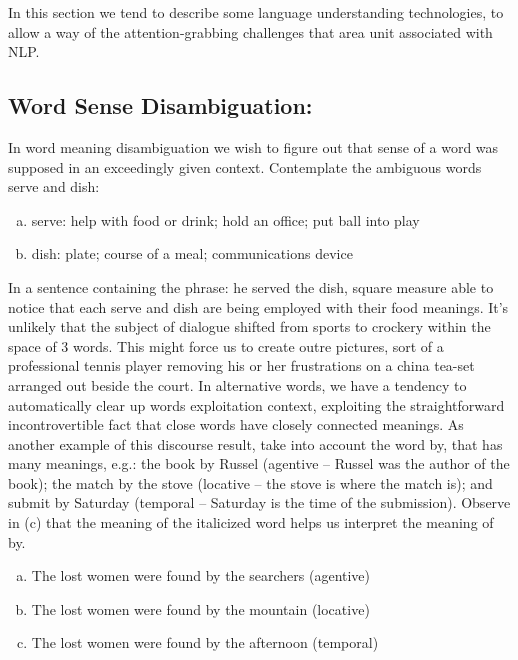 In this section we tend to describe some language understanding technologies, to allow a way of the attention-grabbing challenges that area unit associated with NLP.
\subsection{Word Sense Disambiguation:}
In word meaning disambiguation we wish to figure out that sense of a word was supposed in an exceedingly given context. Contemplate the ambiguous words serve and dish:

\begin{enumerate}[a.]
    \item serve: help with food or drink; hold an office; put ball into play
    \item dish: plate; course of a meal; communications device    
\end{enumerate}
In a sentence containing the phrase: he served the dish, square measure able to notice that each serve and dish are being employed with their food meanings. It's unlikely that the subject of dialogue shifted from sports to crockery within the space of 3 words. This might force us to create outre pictures, sort of a professional tennis player removing his or her frustrations on a china tea-set arranged out beside the court. In alternative words, we have a tendency to automatically clear up words exploitation context, exploiting the straightforward incontrovertible fact that close words have closely connected meanings. As another example of this discourse result, take into account the word by, that has many meanings, e.g.: the book by Russel (agentive -- Russel was the author of the book); the match by the stove (locative -- the stove is where the match is); and submit by Saturday (temporal -- Saturday is the time of the submission). Observe in (c) that the meaning of the italicized word helps us interpret the meaning of by.

\begin{enumerate}[a.]
    \item The lost women were found by the searchers (agentive)
    \item The lost women were found by the mountain (locative)
    \item The lost women were found by the afternoon (temporal)    
\end{enumerate}


